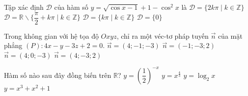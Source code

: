 \begin{ex}%
Tập xác định $\mathscr{D}$ của hàm số $y = \sqrt{\cos x -1}+1-\cos^2x$ là 
\choice
{\True $\mathscr{D} = \{2k\pi \mid k \in \mathbb{Z} \}$}
{$\mathscr{D} = \mathbb{R} \backslash \{\dfrac{\pi}{2}+ k\pi \mid k \in \mathbb{Z} \}$}
{$\mathscr{D} = \{k\pi \mid k \in \mathbb{Z} \}$}
{$\mathscr{D} = \{0\}$}
\end{ex}

\begin{ex}%
Trong không gian với hệ  tọa độ  $Oxyz$, chỉ  ra một véc-tơ pháp tuyến $\overrightarrow{n}$ của mặt phẳng $(P):  4x - y - 3z +2 =0$.
\choice
{\True $\overrightarrow{n}=(4;-1;-3)$}
{$\overrightarrow{n}=(-1;-3;2)$}
{$\overrightarrow{n}=(4;0;-3)$}
{$\overrightarrow{n}=(4;-3;2)$}
\end{ex}

\begin{ex}%
Hàm số   nào sau đây đồng biến trên $\mathbb{R}$?
\choice
{\True $y=\left(\dfrac{1}{2}\right)^{-x}$}
{$y=x^{\frac{4}{3}}$}
{$y=\log_2x$}
{$y=x^3+x^2+1$}
\end{ex}

